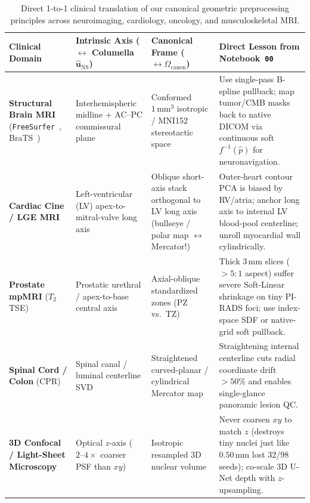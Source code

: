 \documentclass[10pt,a4paper]{article}
\renewcommand{\_}{\origunderscore\allowbreak}
\begin{document}
\begin{table}[htbp]
\centering
\caption[Clinical quantitative imaging parallels to canonical preprocessing $f = f_2 \circ f_1$]{Direct 1-to-1 clinical translation of our canonical geometric preprocessing principles across neuroimaging, cardiology, oncology, and musculoskeletal MRI.}
\label{tab:clinical_canonical}
{\footnotesize
\setlength{\tabcolsep}{3.5pt}
\renewcommand{\arraystretch}{1.24}
\begin{tabularx}{\textwidth}{L{2.85cm} L{3.65cm} L{3.85cm} Y}
\toprule
{}\textbf{Clinical Domain} & \textbf{Intrinsic Axis ($\leftrightarrow$ Columella $\hat{\mathbf{u}}_{\text{NS}}$)} & \textbf{Canonical Frame ($\leftrightarrow \Omega_{\text{canon}}$)} & \textbf{Direct Lesson from Notebook~\texttt{00}} \\
\midrule
\textbf{Structural Brain MRI} (\texttt{FreeSurfer}~\cite{fischl2012freesurfer}, BraTS~\cite{menze2015brats}) & Interhemispheric midline + AC--PC commissural plane & Conformed $1\,\text{mm}^3$ isotropic / MNI152 stereotactic space & Use single-pass B-spline pullback; map tumor/CMB masks back to native DICOM via continuous soft $f^{-1}(\hat{p})$ for neuronavigation. \\
\textbf{Cardiac Cine / LGE MRI}~\cite{hill2001registration} & Left-ventricular (LV) apex-to-mitral-valve long axis & Oblique short-axis stack orthogonal to LV long axis (bullseye / polar map $\leftrightarrow$ Mercator!) & Outer-heart contour PCA is biased by RV/atria; anchor long axis to internal LV blood-pool centerline; unroll myocardial wall cylindrically. \\
\textbf{Prostate mpMRI} ($T_2$ TSE) & Prostatic urethral / apex-to-base central axis & Axial-oblique standardized zones (PZ vs.\ TZ) & Thick $3\,\text{mm}$ slices ($>5:1$ aspect) suffer severe Soft-Linear shrinkage on tiny PI-RADS foci; use index-space SDF or native-grid soft pullback. \\
\textbf{Spinal Cord / Colon} (CPR) & Spinal canal / luminal centerline SVD & Straightened curved-planar / cylindrical Mercator map & Straightening internal centerline cuts radial coordinate drift $>50\%$ and enables single-glance panoramic lesion QC. \\
\textbf{3D Confocal / Light-Sheet Microscopy}~\cite{weigert2020stardist3d,stringer2021cellpose} & Optical $z$-axis ($2\text{--}4\times$ coarser PSF than $xy$) & Isotropic resampled 3D nuclear volume & Never coarsen $xy$ to match $z$ (destroys tiny nuclei just like $0.50\,\text{mm}$ lost $32/98$ seeds); co-scale 3D U-Net depth with $z$-upsampling. \\
\bottomrule
\end{tabularx}
}
\end{table}
\end{document}

